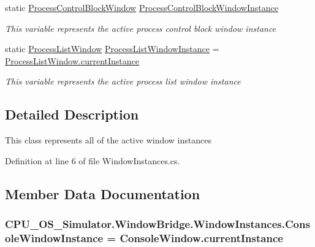 \begin{DoxyCompactItemize}
static \hyperlink{class_c_p_u___o_s___simulator_1_1_process_control_block_window}{Process\+Control\+Block\+Window} \hyperlink{class_c_p_u___o_s___simulator_1_1_window_bridge_1_1_window_instances_a7c6ba1b614cf567f4a34d455cd98b8e0}{Process\+Control\+Block\+Window\+Instance}
\begin{DoxyCompactList}\small\item\em This variable represents the active process control block window instance \end{DoxyCompactList}\item 
static \hyperlink{class_c_p_u___o_s___simulator_1_1_process_list_window}{Process\+List\+Window} \hyperlink{class_c_p_u___o_s___simulator_1_1_window_bridge_1_1_window_instances_a1e4da15e51ef4f7cd4f4862e411630e9}{Process\+List\+Window\+Instance} = \hyperlink{class_c_p_u___o_s___simulator_1_1_process_list_window_a102d7796240201b548db10f1d129d9d0}{Process\+List\+Window.\+current\+Instance}
\begin{DoxyCompactList}\small\item\em This variable represents the active process list window instance \end{DoxyCompactList}\end{DoxyCompactItemize}


\subsection{Detailed Description}
This class represents all of the active window instances 



Definition at line 6 of file Window\+Instances.\+cs.



\subsection{Member Data Documentation}
\hypertarget{class_c_p_u___o_s___simulator_1_1_window_bridge_1_1_window_instances_a90b746b2373f150cab75e4dee0f91c45}{}
\subsubsection[{Console\+Window\+Instance}]{ C\+P\+U\+\_\+\+O\+S\+\_\+\+Simulator.\+Window\+Bridge.\+Window\+Instances.\+Console\+Window\+Instance = {\bf Console\+Window.\+current\+Instance}\hspace{0.3cm}{\ttfamily [static]}}\label{class_c_p_u___o_s___simulator_1_1_window_bridge_1_1_window_instances_a90b746b2373f150cab75e4dee0f91c45}


